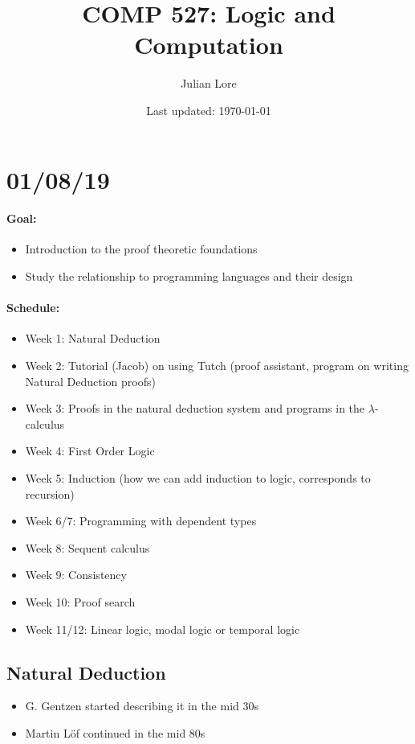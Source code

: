 \documentclass[12 pt]{article}
\author{Julian Lore}
\date{Last updated: \today}
\title{COMP 527: Logic and Computation}
\begin{document}
	\onehalfspacing
	\maketitle
	\tableofcontents
    \section{01/08/19}
    \paragraph{Goal:}
    \begin{itemize}
    \item Introduction to the proof theoretic foundations
    \item Study the relationship to programming languages and their
      design
    \end{itemize}
    \paragraph{Schedule:}
    \begin{itemize}
    \item Week 1: Natural Deduction
    \item Week 2: Tutorial (Jacob) on using Tutch (proof assistant,
      program on writing Natural Deduction proofs)
    \item Week 3: Proofs in the natural deduction system and programs
      in the $\lambda$-calculus
    \item Week 4: First Order Logic
    \item Week 5: Induction (how we can add induction to logic,
      corresponds to recursion)
    \item Week 6/7: Programming with dependent types
    \item Week 8: Sequent calculus
    \item Week 9: Consistency
    \item Week 10: Proof search
    \item Week 11/12: Linear logic, modal logic or temporal logic
    \end{itemize}
    \subsection{Natural Deduction}
    \begin{itemize}
    \item G. Gentzen started describing it in the mid 30s
    \item Martin L\"of continued in the mid 80s
    \end{itemize}
\end{document}
